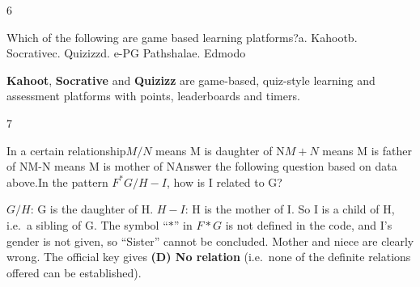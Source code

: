 \begin{question}{6}
{Which of the following are game based learning platforms?\newline a. Kahoot\newline b. Socrative\newline c. Quizizz\newline d. e-PG Pathshala\newline e. Edmodo\par}
\begin{explain}
\textbf{Kahoot}, \textbf{Socrative} and \textbf{Quizizz} are game-based, quiz-style learning and assessment platforms with points, leaderboards and timers.
\end{explain}
\end{question}

\begin{question}{7}
{In a certain relationship\newline $M/N$ means M is daughter of N\newline $M+N$ means M is father of N\newline M-N means M is mother of N\newline Answer the following question based on data above.\newline In the pattern $F^{*}G/H-I$, how is I related to G?\par}
\begin{explain}
$G/H$: G is the daughter of H. $H-I$: H is the mother of I. So I is a child of H, i.e.\ a sibling of G. The symbol ``$*$'' in $F*G$ is not defined in the code, and I's gender is not given, so ``Sister'' cannot be concluded. Mother and niece are clearly wrong. The official key gives \textbf{(D) No relation} (i.e.\ none of the definite relations offered can be established).
\end{explain}
\end{question}

